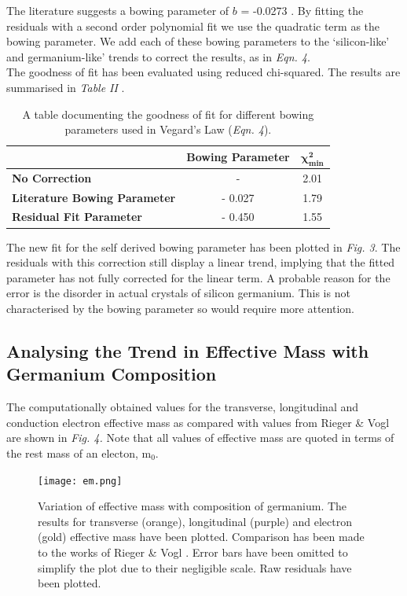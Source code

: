 \documentclass[10pt, twocolumn]{revtex4}    %
\begin{document}
The literature suggests a bowing parameter of $b$ = -0.0273 \cite{ref04}. By fitting the residuals with a second order polynomial fit we use the quadratic term as the bowing parameter. We add each of these bowing parameters to the `silicon-like' and germanium-like' trends to correct the results, as in \textit{Eqn. 4}. \\

The goodness of fit has been evaluated using reduced chi-squared. The results are summarised in \textit{Table II} \cite{ref12}.
\begin{table}[h!]
\begin{tabular}{|l|c|c|}
\hline
             & \textbf{Bowing Parameter} &$ \mathbf{\chi^2_{min}}$\\ \hline
\textbf{No Correction}       & -                & 2.01     \\
\textbf{Literature Bowing Parameter}  & - 0.027           & 1.79     \\
\textbf{Residual Fit Parameter} & - 0.450           & 1.55     \\ \hline
\end{tabular}
\caption{A table documenting the goodness of fit for different bowing parameters used in Vegard's Law (\textit{Eqn. 4}).}
\label{tab:my-table}
\end{table}


The new fit for the self derived bowing parameter has been plotted in \textit{Fig. 3}. The residuals with this correction still display a linear trend, implying that the fitted parameter has not fully corrected for the linear term. A probable reason for the error is the disorder in actual crystals of silicon germanium. This is not characterised by the bowing parameter so would require more attention.


\subsection{Analysing the Trend in Effective Mass with Germanium Composition}

The computationally obtained values for the transverse, longitudinal and conduction electron effective mass as compared with values from Rieger \& Vogl \cite{ref07} are shown in \textit{Fig. 4.} Note that all values of effective mass are quoted in terms of the rest mass of an electon, m$_0$.\\
\begin{figure}[h!]
 \hspace*{-0.5cm}
  \texttt{[image: em.png]}

    \caption{Variation of effective mass with composition of germanium. The results for transverse (orange), longitudinal (purple) and electron (gold) effective mass have been plotted. Comparison has been made to the works of Rieger \& Vogl \cite{ref07}. Error bars have been omitted to simplify the plot due to their negligible scale. Raw residuals have been plotted.}
\end{figure}
\end{document}
